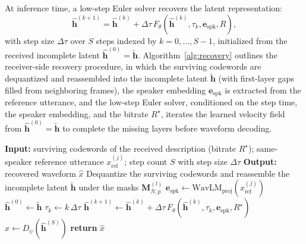\documentclass[lettersize,journal]{IEEEtran}
\begin{document}
At inference time, a low-step Euler solver recovers the latent representation:
\begin{equation}
\widehat{\mathbf{h}}^{(k+1)}=\widehat{\mathbf{h}}^{(k)}+\Delta \tau\,F_{\theta}(\widehat{\mathbf{h}}^{(k)},\tau_k,\mathbf{e}_{\mathrm{spk}},R),
\end{equation}
with step size $\Delta\tau$ over $S$ steps indexed by $k=0,\ldots,S-1$, initialized from the received incomplete latent $\widehat{\mathbf{h}}^{(0)}=\widetilde{\mathbf{h}}$. Algorithm~\ref{alg:recovery} outlines the receiver-side recovery procedure, in which the surviving codewords are dequantized and reassembled into the incomplete latent $\widetilde{\mathbf{h}}$ (with first-layer gaps filled from neighboring frames), the speaker embedding $\mathbf{e}_{\mathrm{spk}}$ is extracted from the reference utterance, and the low-step Euler solver, conditioned on the step time, the speaker embedding, and the bitrate $R^{\star}$, iterates the learned velocity field from $\widehat{\mathbf{h}}^{(0)}=\widetilde{\mathbf{h}}$ to complete the missing layers before waveform decoding.

\begin{algorithm}[tb]\small
\setlength{\baselineskip}{12.0pt}
\caption{Receiver-Side Recovery of PDSSC}
\label{alg:recovery}
\begin{algorithmic}[1]
\STATE \textbf{Input:} surviving codewords of the received description (bitrate $R^{\star}$); same-speaker reference utterance $x_{\mathrm{ref}}^{(j)}$; step count $S$ with step size $\Delta\tau$
\STATE \textbf{Output:} recovered waveform $\hat{x}$
\STATE Dequantize the surviving codewords and reassemble the incomplete latent $\widetilde{\mathbf{h}}$ under the masks $\mathbf{M}^{(l)}_{N,p}$ 
\STATE $\mathbf{e}_{\mathrm{spk}}\leftarrow\mathrm{WavLM}_{\mathrm{proj}}(x_{\mathrm{ref}}^{(j)})$ 
\STATE $\widehat{\mathbf{h}}^{(0)}\leftarrow\widetilde{\mathbf{h}}$
\STATE $\tau_k\leftarrow k\,\Delta\tau$ 
\STATE $\widehat{\mathbf{h}}^{(k+1)}\leftarrow\widehat{\mathbf{h}}^{(k)}+\Delta\tau\,F_{\theta}(\widehat{\mathbf{h}}^{(k)},\tau_{k},\mathbf{e}_{\mathrm{spk}},R^{\star})$ 
\ENDFOR
\STATE $\hat{x}\leftarrow D_{\psi}(\widehat{\mathbf{h}}^{(S)})$ 
\STATE \textbf{return} $\hat{x}$
\end{algorithmic}
\end{algorithm}
\end{document}
